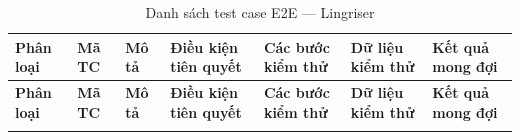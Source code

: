 {
\renewcommand{\arraystretch}{1.05}
\setlength{\tabcolsep}{3pt}
\footnotesize
\begin{landscape}
\pagestyle{plain}
\begin{longtable}{|>{\raggedright\arraybackslash}p{1.2cm}|>{\raggedright\arraybackslash}p{1.0cm}|>{\raggedright\arraybackslash}p{2.8cm}|>{\raggedright\arraybackslash}p{2.5cm}|>{\raggedright\arraybackslash}p{4.5cm}|>{\raggedright\arraybackslash}p{2.5cm}|>{\raggedright\arraybackslash}p{4.5cm}|}
\caption{Danh sách test case E2E --- Lingriser}
\label{tab:e2e-lingriser} \\
\hline
\textbf{Phân loại} & \textbf{Mã TC} & \textbf{Mô tả} & \textbf{Điều kiện tiên quyết} & \textbf{Các bước kiểm thử} & \textbf{Dữ liệu kiểm thử} & \textbf{Kết quả mong đợi} \\
\hline
\endfirsthead

\hline
\textbf{Phân loại} & \textbf{Mã TC} & \textbf{Mô tả} & \textbf{Điều kiện tiên quyết} & \textbf{Các bước kiểm thử} & \textbf{Dữ liệu kiểm thử} & \textbf{Kết quả mong đợi} \\
\hline
\endhead

\hline
\endfoot


\end{longtable}
\end{landscape}}
